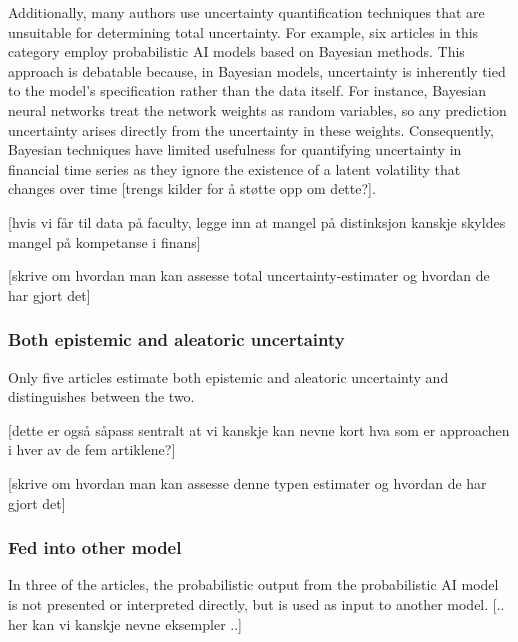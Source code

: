 Additionally, many authors use uncertainty quantification techniques that are unsuitable for determining total uncertainty. For example, six articles in this category employ probabilistic AI models based on Bayesian methods. This approach is debatable because, in Bayesian models, uncertainty is inherently tied to the model's specification rather than the data itself. For instance, Bayesian neural networks treat the network weights as random variables, so any prediction uncertainty arises directly from the uncertainty in these weights. Consequently, Bayesian techniques have limited usefulness for quantifying uncertainty in financial time series as they ignore the existence of a latent volatility that changes over time [trengs kilder for å støtte opp om dette?].

[hvis vi får til data på faculty, legge inn at mangel på distinksjon kanskje skyldes mangel på kompetanse i finans]

[skrive om hvordan man kan assesse total uncertainty-estimater og hvordan de har gjort det]

\subsubsection{Both epistemic and aleatoric uncertainty}

Only five articles estimate both epistemic and aleatoric uncertainty and distinguishes between the two.

[dette er også såpass sentralt at vi kanskje kan nevne kort hva som er approachen i hver av de fem artiklene?]

[skrive om hvordan man kan assesse denne typen estimater og hvordan de har gjort det]

\subsubsection{Fed into other model}

In three of the articles, the probabilistic output from the probabilistic AI model is not presented or interpreted directly, but is used as input to another model. [.. her kan vi kanskje nevne eksempler ..]



